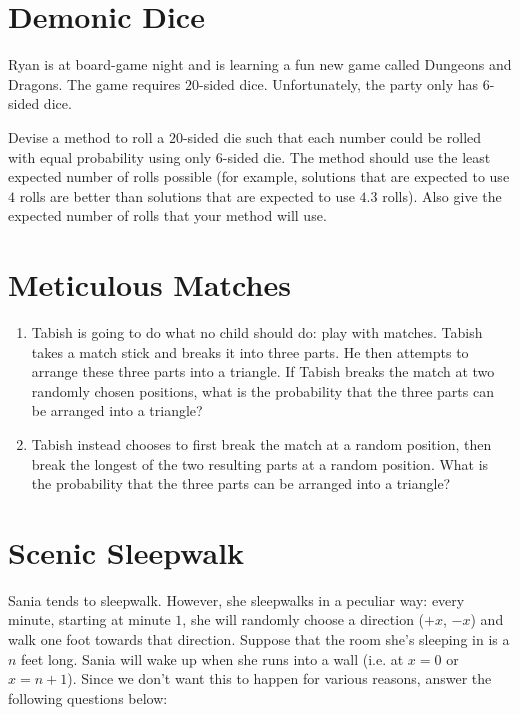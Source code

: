 \documentclass{article}
\begin{document}
\section{Demonic Dice}

Ryan is at board-game night and is learning a fun new game called Dungeons and Dragons. The game requires $20$-sided dice. Unfortunately, the party only has $6$-sided dice.

Devise a method to roll a $20$-sided die such that each number could be rolled with equal probability using only $6$-sided die. The method should use the least expected number of rolls possible (for example, solutions that are expected to use $4$ rolls are better than solutions that are expected to use $4.3$ rolls). Also give the expected number of rolls that your method will use.

\vfill \vfill

\section{Meticulous Matches}

\begin{enumerate}[label=(\alph*)]
\itemsep0em
    \item Tabish is going to do what no child should do: play with matches. Tabish takes a match stick and breaks it into three parts. He then attempts to arrange these three parts into a triangle. If Tabish breaks the match at two randomly chosen positions, what is the probability that the three parts can be arranged into a triangle?\vfill
    
    \item Tabish instead chooses to first break the match at a random position, then break the longest of the two resulting parts at a random position. What is the probability that the three parts can be arranged into a triangle?\vfill
\end{enumerate}

\newpage

\section{Scenic Sleepwalk}

Sania tends to sleepwalk. However, she sleepwalks in a peculiar way: every minute, starting at minute $1$, she will randomly choose a direction ($+x$, $-x$) and walk one foot towards that direction. Suppose that the room she's sleeping in is a $n$ feet long. Sania will wake up when she runs into a wall (i.e. at $x = 0$ or $x = n+1$). Since we don't want this to happen for various reasons, answer the following questions below:
\end{document}
